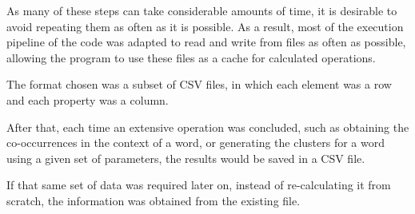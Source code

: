 As many of these steps can take considerable amounts of time, it is desirable to
avoid repeating them as often as it is possible. As a result, most of the
execution pipeline of the code was adapted to read and write from files as often
as possible, allowing the program to use these files as a cache for calculated
operations.

The format chosen was a subset of \ac{CSV} files, in which each element was a
row and each property was a column.

After that, each time an extensive operation was concluded, such as obtaining
the co-occurrences in the context of a word, or generating the clusters for a
word using a given set of parameters, the results would be saved in a CSV file.

If that same set of data was required later on, instead of re-calculating it
from scratch, the information was obtained from the existing file.

